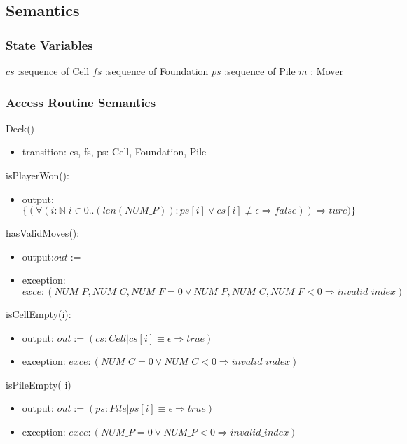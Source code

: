 \documentclass[12pt,fleqn]{article}
\begin{document}
\subsection* {Semantics}

\subsubsection* {State Variables}
$cs$ :sequence of Cell
$fs$ :sequence of Foundation
$ps$ :sequence of Pile
$m$ : Mover
 
\subsubsection* {Access Routine Semantics}

\noindent Deck()
\begin{itemize}
\item transition: cs, fs, ps: Cell, Foundation, Pile
\end{itemize}


\noindent isPlayerWon():
\begin{itemize}
\item output: $\{(\forall(i:\mathbb{N}|i \in 0..(len(NUM\_P)):ps[i]\lor cs[i] \not \equiv \epsilon \Rightarrow false))\Rightarrow ture)\}$  
\end{itemize}

\noindent hasValidMoves():
\begin{itemize}
\item output:$out :=$
\item exception: $exce : (NUM\_P, NUM\_C, NUM\_F  = 0 \lor NUM\_P, NUM\_C, NUM\_F  < 0  \Rightarrow invalid\_index)$
\end{itemize}

\noindent isCellEmpty(i):
\begin{itemize}
\item output: $out := (cs:Cell|cs[i]\equiv \epsilon \Rightarrow true)$
\item exception: $exce : (NUM\_C  = 0 \lor  NUM\_C  < 0  \Rightarrow invalid\_index)$

\end{itemize}

\noindent isPileEmpty( i)
\begin{itemize}
\item output: $out := (ps:Pile|ps[i]\equiv \epsilon \Rightarrow true)$
\item exception: $exce : (NUM\_P  = 0 \lor NUM\_P < 0  \Rightarrow invalid\_index)$
\end{itemize}
\end{document}
